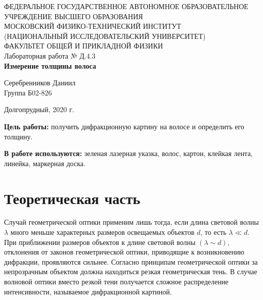 \documentclass[a4paper,12pt]{article} %
\begin{document}
\begin{center}
	\footnotesize{ФЕДЕРАЛЬНОЕ ГОСУДАРСТВЕННОЕ АВТОНОМНОЕ ОБРАЗОВАТЕЛЬНОЕ 			УЧРЕЖДЕНИЕ ВЫСШЕГО ОБРАЗОВАНИЯ}\\
	\footnotesize{МОСКОВСКИЙ ФИЗИКО-ТЕХНИЧЕСКИЙ ИНСТИТУТ\\(НАЦИОНАЛЬНЫЙ 			ИССЛЕДОВАТЕЛЬСКИЙ УНИВЕРСИТЕТ)}\\
	\footnotesize{ФАКУЛЬТЕТ ОБЩЕЙ И ПРИКЛАДНОЙ ФИЗИКИ\\}
	\hfill \break
	\hfill\break
	\hfill\break
	\hfill \break
	\hfill \break
	\hfill \break
	\hfill \break
	\hfill \break
	\hfill \break
	\hfill \break
	\hfill \break
	\hfill \break
	\hfill \break
	\hfill \break
	\large{Лабораторная работа № Д.4.3 \\\textbf{Измерение толщины волоса}}\\
	\hfill \break
	\hfill \break
	\hfill \break
	\begin{flushright}
		Серебренников Даниил\\
		Группа Б02-826
	\end{flushright}
	\hfill \break
	\hfill \break
	\hfill \break
	\hfill \break
	\hfill \break
	\hfill \break
	\hfill \break
	\hfill \break
	\hfill \break
	\hfill \break
	\hfill \break
\end{center}
\begin{center}
	Долгопрудный, 2020 г.
\end{center}
\thispagestyle{empty}
\newpage

\textbf{Цель работы:} получить дифракционную картину на волосе и определить его толщину.

\textbf{В работе используются:} зеленая лазерная указка, волос, картон, клейкая лента, линейка, маркерная доска.

\section{Теоретическая часть}
	Случай геометрической оптики применим лишь тогда, если длина световой волны $\lambda$ много меньше характерных размеров освещаемых объектов $d$, то есть $\lambda \ll d$. При приближении размеров объектов к длине световой волны $(\lambda \sim d)$, отклонения от законов геометрической оптики, приводящие к возникновению дифракции, проявляются сильнее. Согласно принципам геометрической оптики за непрозрачным объектом должна находиться резкая геометрическая тень. В случае волновой оптики вместо резкой тени получается сложное распределение интенсивности, называемое дифракционной картиной.
\end{document}
